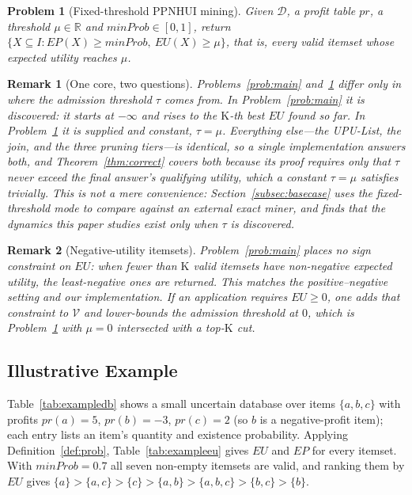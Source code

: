 \documentclass[pdflatex,sn-vancouver-num]{sn-jnl}
\theoremstyle{thmstyleone}%
\theoremstyle{thmstyletwo}%
\newtheorem{remark}{Remark}%
\theoremstyle{thmstylethree}%
\newtheorem{problem}{Problem}%
\newcommand{\DB}{\mathcal{D}}
\newcommand{\pr}{\mathit{pr}}
\newcommand{\EU}{\mathit{EU}}
\newcommand{\EP}{\mathit{EP}}
\newcommand{\minprob}{\mathit{minProb}}
\newcommand{\itemset}{X}
\newcommand{\Kk}{\mathrm{K}}
\begin{document}
\begin{problem}[Fixed-threshold PPNHUI mining]\label{prob:minutil}
Given $\DB$, a profit table $\pr$, a threshold $\mu\in\mathbb{R}$ and
$\minprob\in[0,1]$, return
$\{\itemset\subseteq I:\EP(\itemset)\ge\minprob,\
\EU(\itemset)\ge\mu\}$, that is, \emph{every} valid itemset whose
expected utility reaches $\mu$.
\end{problem}
 
\begin{remark}[One core, two questions]\label{rem:twomodes}
Problems~\ref{prob:main} and~\ref{prob:minutil} differ only in where the
admission threshold $\tau$ comes from. In Problem~\ref{prob:main} it is
\emph{discovered}: it starts at $-\infty$ and rises to the $\Kk$-th best
$\EU$ found so far. In Problem~\ref{prob:minutil} it is \emph{supplied}
and constant, $\tau=\mu$. Everything else---the UPU-List, the join, and
the three pruning tiers---is identical, so a single implementation
answers both, and Theorem~\ref{thm:correct} covers both because its
proof requires only that $\tau$ never exceed the final answer's
qualifying utility, which a constant $\tau=\mu$ satisfies trivially.
This is not a mere convenience: Section~\ref{subsec:basecase} uses the
fixed-threshold mode to compare against an external exact miner, and
finds that the dynamics this paper studies exist only when $\tau$ is
discovered.
\end{remark}

\begin{remark}[Negative-utility itemsets]\label{rem:negEU}
Problem~\ref{prob:main} places no sign constraint on $\EU$: when fewer than $\Kk$
valid itemsets have non-negative expected utility, the least-negative ones are
returned. This matches the positive--negative setting and our implementation. If
an application requires $\EU\ge0$, one adds that constraint to $\mathcal{V}$ and
lower-bounds the admission threshold at $0$, which is Problem~\ref{prob:minutil} with $\mu=0$ intersected with a top-$\Kk$ cut.
\end{remark}

\subsection{Illustrative Example}\label{subsec:example}

Table~\ref{tab:exampledb} shows a small uncertain database over items
$\{a,b,c\}$ with profits $\pr(a)=5$, $\pr(b)=-3$, $\pr(c)=2$ (so $b$ is
a negative-profit item); each entry lists an item's quantity and
existence probability. Applying Definition~\ref{def:prob},
Table~\ref{tab:exampleeu} gives $\EU$ and $\EP$ for every itemset. With
$\minprob=0.7$ all seven non-empty itemsets are valid, and ranking them
by $\EU$ gives
$\{a\}\!>\!\{a,c\}\!>\!\{c\}\!>\!\{a,b\}\!>\!\{a,b,c\}\!>\!\{b,c\}\!>\!\{b\}$.
 
\end{document}
